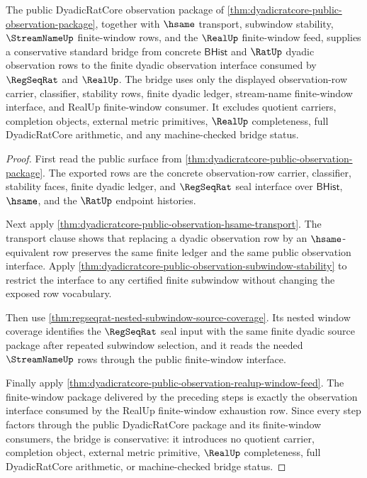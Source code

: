 \begin{theorem}
\label{thm:dyadicratcore-public-observation-standard-bridge-boundary}
The public DyadicRatCore observation package of
\autoref{thm:dyadicratcore-public-observation-package}, together with
$\hsame$ transport, subwindow stability, $\StreamNameUp$ finite-window rows, and
the $\RealUp$ finite-window feed, supplies a conservative standard bridge from
concrete $\mathsf{BHist}$ and $\RatUp$ dyadic observation rows to the finite
dyadic observation interface consumed by $\RegSeqRat$ and $\RealUp$. The bridge
uses only the displayed observation-row carrier, classifier, stability rows,
finite dyadic ledger, stream-name finite-window interface, and RealUp
finite-window consumer. It excludes quotient carriers, completion objects,
external metric primitives, $\RealUp$ completeness, full DyadicRatCore
arithmetic, and any machine-checked bridge status.
\end{theorem}
\begin{proof}
First read the public surface from
\autoref{thm:dyadicratcore-public-observation-package}. The exported rows are
the concrete observation-row carrier, classifier, stability faces, finite
dyadic ledger, and $\RegSeqRat$ seal interface over $\mathsf{BHist}$,
$\hsame$, and the $\RatUp$ endpoint histories.

Next apply
\autoref{thm:dyadicratcore-public-observation-hsame-transport}. The
transport clause shows that replacing a dyadic observation row by an
$\hsame$-equivalent row preserves the same finite ledger and the same public
observation interface. Apply
\autoref{thm:dyadicratcore-public-observation-subwindow-stability} to restrict
the interface to any certified finite subwindow without changing the exposed
row vocabulary.

Then use \autoref{thm:regseqrat-nested-subwindow-source-coverage}. Its nested
window coverage identifies the $\RegSeqRat$ seal input with the same finite
dyadic source package after repeated subwindow selection, and it reads the
needed $\StreamNameUp$ rows through the public finite-window interface.

Finally apply
\autoref{thm:dyadicratcore-public-observation-realup-window-feed}. The
finite-window package delivered by the preceding steps is exactly the
observation interface consumed by the RealUp finite-window exhaustion row.
Since every step factors through the public DyadicRatCore package and its
finite-window consumers, the bridge is conservative: it introduces no quotient
carrier, completion object, external metric primitive, $\RealUp$ completeness,
full DyadicRatCore arithmetic, or machine-checked bridge status.
\end{proof}

